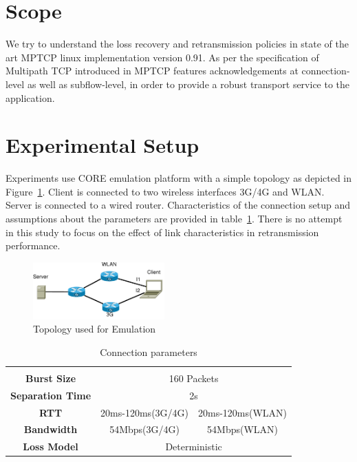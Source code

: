 \documentclass[10pt,draftcls,twocolumn]{IEEEconf}
\begin{document}
\section{Scope}\label{scope}

We try to understand the loss recovery and retransmission policies in state of the art MPTCP linux implementation version 0.91. As per the specification of Multipath TCP introduced in 
MPTCP features acknowledgements at connection-level as well as subflow-level, in order to provide a robust transport service to the application.


\section{Experimental Setup}\label{exsetup}

Experiments use CORE emulation platform with a simple topology as depicted in Figure~\ref{fig1}.
Client is connected to two wireless interfaces 3G/4G and WLAN. Server is connected to a wired router.
Characteristics of the connection setup and assumptions about the parameters are provided in table~\ref{tab1}.
There is no attempt in this study to focus on the effect of link characteristics in retransmission performance.
 
\begin{figure}[!ht]
\begin{center}
\includegraphics[angle=0, width=0.45\textwidth]{images/fortest.pdf}
\caption{Topology used for Emulation}\label{fig1}
\end{center}
\end{figure}
\begin{center}

\begin{table}
\begin{center}
\begin{tabular}{|c|cccccccccc|}
      \hline
      \multicolumn{1}{c}{} & & \\[\dimexpr-\normalbaselineskip-\arrayrulewidth]
      \textbf{Burst Size} & \multicolumn{10}{c|}{160 Packets} \\
      \hline
      \textbf{Separation Time} & \multicolumn{10}{c|}{2s} \\
      \hline

      \textbf{RTT} & \multicolumn{5}{c|}{20ms-120ms(3G/4G)} & \multicolumn{5}{c|}{20ms-120ms(WLAN)} \\
      \hline 	
      \textbf{Bandwidth} & \multicolumn{5}{c|}{54Mbps(3G/4G)} & \multicolumn{5}{c|}{54Mbps(WLAN)} \\
      \hline
      \textbf{Loss Model} & \multicolumn{10}{c|}{Deterministic}\\
      \hline
\end{tabular}
\caption{Connection parameters}\label{tab1}
\end{center}
\end{table}
\end{center}
\end{document}

